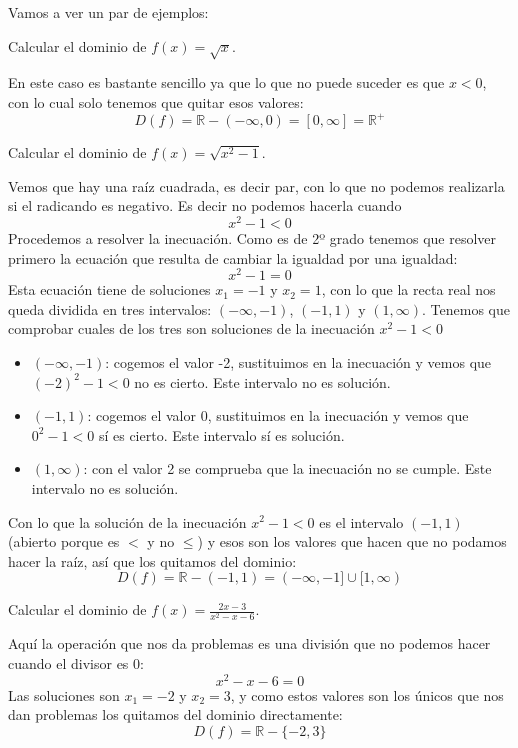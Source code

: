 \documentclass[a4paper,11pt,answers]{exam}
\begin{document}
Vamos a ver un par de ejemplos:\\
\begin{questions}
\question Calcular el dominio de $f(x) = \sqrt{x}$.
\begin{solution}
En este caso es bastante sencillo ya que lo que no puede suceder es que $x<0$, con lo cual solo tenemos que quitar esos valores:
\[D(f) = \mathbb{R} - (-\infty, 0) = [0, \infty] = \mathbb{R}^+\]
\end{solution}
\question Calcular el dominio de $f(x) = \sqrt{x^2 - 1}$.
\begin{solution}
Vemos que hay una raíz cuadrada, es decir par, con lo que no podemos realizarla si el radicando es negativo. Es decir no podemos hacerla cuando
\[x^2 - 1 < 0\]
Procedemos a resolver la inecuación. Como es de 2º grado tenemos que resolver primero la ecuación que resulta de cambiar la igualdad por una igualdad:
\[x^2 -1 = 0\]
Esta ecuación tiene de soluciones $x_1 = -1$ y $x_2 = 1$, con lo que la recta real nos queda dividida en tres intervalos: $(-\infty, -1)$,  $(-1, 1)$ y $(1, \infty)$. Tenemos que comprobar cuales de los tres son soluciones de la inecuación $x^2 - 1 < 0$
\begin{itemize}
	\item $(-\infty, -1)$: cogemos el valor -2, sustituimos en la inecuación y vemos que $(-2)^2 - 1 < 0$ no es cierto. Este intervalo no es solución.
	\item $(-1, 1)$: cogemos el valor 0, sustituimos en la inecuación y vemos que $0^2 - 1 < 0$ sí es cierto. Este intervalo sí es solución.
	\item $(1, \infty)$: con el valor 2 se comprueba que la inecuación no se cumple. Este intervalo no es solución.
\end{itemize}
Con lo que la solución de la inecuación $x^2 -  1 < 0$ es el intervalo $(-1, 1)$ (abierto porque es $<$ y no $\leq$) y esos son los valores que hacen que no podamos hacer la raíz, así que los quitamos del dominio:
\[D(f) = \mathbb{R} - (-1, 1) = (-\infty, -1] \cup [1, \infty)\]
\end{solution}

\question Calcular el dominio de $f(x) = \frac{2x - 3}{x^2 - x - 6}$.
\begin{solution}
Aquí la operación que nos da problemas es una división que no podemos hacer cuando el divisor es 0:
\[x^2 - x - 6 = 0\]
Las soluciones son $x_1 = -2$ y $x_2 = 3$, y como estos valores son los únicos que nos dan problemas los quitamos del dominio directamente:
\[D(f) = \mathbb{R} - \{-2, 3\}\]
\end{solution}
\end{questions}
\end{document}
